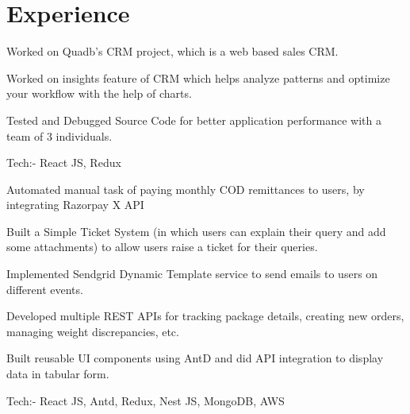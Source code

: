 \documentclass[]{deedy-resume-openfont}
\begin{document}
\begin{minipage}[t]{0.66\textwidth} 


\section{Experience}

\vspace{\topsep}
\begin{tightemize}
\item Worked on Quadb's CRM project, which is a web based sales CRM.
\item Worked on insights feature of CRM which helps analyze patterns and optimize your workflow with the help of charts.
\item Tested and Debugged Source Code for better application
performance with a team of 3 individuals.
\item Tech:- React JS, Redux
\end{tightemize}
\sectionsep

\begin{tightemize}
\item Automated manual task of paying monthly COD remittances to users, by integrating Razorpay X API
\item Built a Simple Ticket System (in which users can explain their query and add some attachments) to allow users raise a ticket for their queries. 
\item Implemented Sendgrid Dynamic Template service to send emails to users on different events.
\item Developed multiple REST APIs for tracking package details, creating new orders, managing weight discrepancies, etc.
\item Built reusable UI components using AntD and did API integration to display data in tabular form.
\item Tech:- React JS, Antd, Redux, Nest JS, MongoDB, AWS
\end{tightemize}
\sectionsep


\end{minipage}
\end{document}
